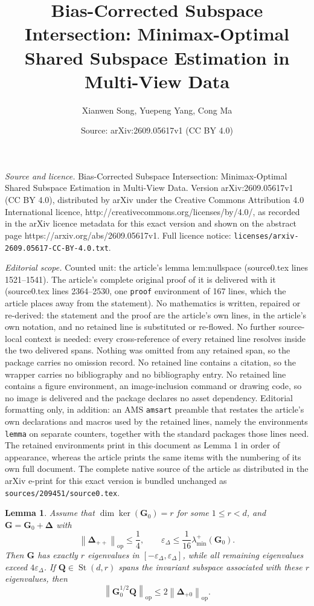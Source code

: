 \documentclass[10pt,a4paper]{amsart}
\title{Bias-Corrected Subspace Intersection: Minimax-Optimal Shared Subspace Estimation in Multi-View Data}
\author{Xianwen Song, Yuepeng Yang, Cong Ma}
\date{Source: arXiv:2609.05617v1 (CC BY 4.0)}
\newtheorem{lemma}{Lemma}
\newcommand{\opn}[1]{\left\lVert #1\right\rVert_{\mathrm{op}}}
\begin{document}
\maketitle

\noindent\emph{Source and licence.} Bias-Corrected Subspace Intersection: Minimax-Optimal Shared Subspace Estimation in Multi-View Data. Version arXiv:2609.05617v1 (CC BY 4.0), distributed by arXiv under the Creative Commons Attribution 4.0 International licence, http://creativecommons.org/licenses/by/4.0/, as recorded in the arXiv licence metadata for this exact version and shown on the abstract page https://arxiv.org/abs/2609.05617v1. Full licence notice: \texttt{licenses/arxiv-2609.05617-CC-BY-4.0.txt}.\par\smallskip

\noindent\textit{Editorial scope.} Counted unit: the article's lemma lem:nullspace (source0.tex lines 1521--1541). The article's complete original proof of it is delivered with it (source0.tex lines 2364--2530, one \texttt{proof} environment of 167 lines, which the article places away from the statement). No mathematics is written, repaired or re-derived: the statement and the proof are the article's own lines, in the article's own notation, and no retained line is substituted or re-flowed.  No further source-local context is needed: every cross-reference of every retained line resolves inside the two delivered spans.  Nothing was omitted from any retained span, so the package carries no omission record.  No retained line contains a citation, so the wrapper carries no bibliography and no bibliography entry.  No retained line contains a figure environment, an image-inclusion command or drawing code, so no image is delivered and the package declares no asset dependency.  Editorial formatting only, in addition: an AMS \texttt{amsart} preamble that restates the article's own declarations and macros used by the retained lines, namely the environments \texttt{lemma} on separate counters, together with the standard packages those lines need.  The retained environments print in this document as Lemma 1 in order of appearance, whereas the article prints the same items with the numbering of its own full document.  The complete native source of the article as distributed in the arXiv e-print for this exact version is bundled unchanged as \texttt{sources/209451/source0.tex}.
\begin{lemma}
\label{lem:nullspace}
Assume that $\dim\ker(\bm G_0)=r$ for some $1\le r< d$, and $\bm G = \bm G_0 + \bm \Delta$ with
\[
  \opn{\bm\Delta_{++}}\le\frac14,
  \qquad
  \varepsilon_\Delta
  \le\frac{1}{16}\lambda_{\min}^{+}(\bm G_0).
\]
Then $\bm G$ has exactly $r$ eigenvalues in
$[-\varepsilon_\Delta,\varepsilon_\Delta]$,
while all remaining eigenvalues exceed $4\varepsilon_\Delta$.
If $\bm Q\in\operatorname{St}(d,r)$ spans the invariant subspace
associated with these $r$ eigenvalues, then
\begin{equation}
\label{eq:abstract-relative-nullspace-conclusion}
  \opn{\bm G_0^{1/2}\bm Q}
  \le
  2\opn{\bm\Delta_{+0}}.
\end{equation}
\end{lemma}
\end{document}
